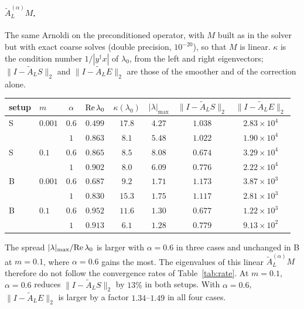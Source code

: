 \documentclass[11pt,a4paper]{article}
\newcommand{\AL}{\tilde A_{L}}
\newcommand{\dg}{^{\dagger}}
\begin{document}
\paragraph{\texorpdfstring{$\AL^{(\alpha)}M$}{A_L M}.} The same Arnoldi on the preconditioned operator, with $M$ built
as in the solver but with exact coarse solves (double precision, $10^{-20}$), so that $M$ is
linear. $\kappa$ is the condition number $1/|y\dg x|$ of $\lambda_0$, from the left and right
eigenvectors; $\|I-\AL S\|_2$ and $\|I-\AL E\|_2$ are those of the smoother and of the
correction alone.
\begin{center}
\begin{tabular}{@{}llcccccc@{}}
\toprule
setup & $m$ & $\alpha$ & ${\rm Re}\,\lambda_0$ & $\kappa(\lambda_0)$ & $|\lambda|_{\max}$ & $\|I-\AL S\|_2$ & $\|I-\AL E\|_2$\\
\midrule
S & $0.001$ & $0.6$ & $0.499$ & $17.8$ & $4.27$ & $1.038$ & $2.83\times10^4$\\
  &         & $1$   & $0.863$ & $8.1$  & $5.48$ & $1.022$ & $1.90\times10^4$\\
S & $0.1$   & $0.6$ & $0.865$ & $8.5$  & $8.08$ & $0.674$ & $3.29\times10^4$\\
  &         & $1$   & $0.902$ & $8.0$  & $6.09$ & $0.776$ & $2.22\times10^4$\\
B & $0.001$ & $0.6$ & $0.687$ & $9.2$  & $1.71$ & $1.173$ & $3.87\times10^3$\\
  &         & $1$   & $0.830$ & $15.3$ & $1.75$ & $1.117$ & $2.81\times10^3$\\
B & $0.1$   & $0.6$ & $0.952$ & $11.6$ & $1.30$ & $0.677$ & $1.22\times10^3$\\
  &         & $1$   & $0.913$ & $6.1$  & $1.28$ & $0.779$ & $9.13\times10^2$\\
\bottomrule
\end{tabular}
\end{center}
The spread $|\lambda|_{\max}/{\rm Re}\,\lambda_0$ is larger with $\alpha=0.6$ in three cases and
unchanged in B at $m=0.1$, where $\alpha=0.6$ gains the most. The eigenvalues of this linear
$\AL^{(\alpha)}M$ therefore do not follow the convergence rates of Table~\ref{tab:rate}. At
$m=0.1$, $\alpha=0.6$ reduces $\|I-\AL S\|_2$ by $13\%$ in both setups. With $\alpha=0.6$,
$\|I-\AL E\|_2$ is larger by a factor $1.34$--$1.49$ in all four cases.
\end{document}
